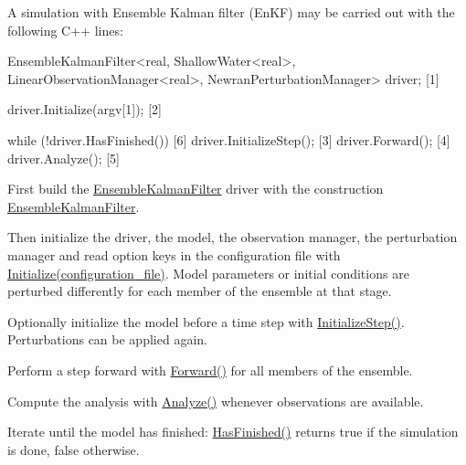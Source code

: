 \documentclass{tufte-book}
\begin{document}
\-A simulation with \-Ensemble \-Kalman filter (\-En\-K\-F) may be carried out with the following \-C++ lines\-:

 \begin{frame_cpp}
EnsembleKalmanFilter<real, ShallowWater<real>,
        LinearObservationManager<real>, NewranPerturbationManager> driver; [1]

driver.Initialize(argv[1]); [2]

while (!driver.HasFinished()) [6]
{
    driver.InitializeStep(); [3]
    driver.Forward(); [4]
    driver.Analyze(); [5]
}
\end{frame_cpp}





\begin{DoxyEnumerate}
\item \-First build the {\ttfamily  \hyperlink{class_verdandi_1_1_ensemble_kalman_filter}{\-Ensemble\-Kalman\-Filter}} driver with the construction {\ttfamily  \hyperlink{class_verdandi_1_1_ensemble_kalman_filter_abb2d27f6bef00753e9998b84fa434903}{\-Ensemble\-Kalman\-Filter}}.


\item \-Then initialize the driver, the model, the observation manager, the perturbation manager and read option keys in the configuration file with {\ttfamily  \hyperlink{}{\-Initialize(configuration\-\_\-file)}}. \-Model parameters or initial conditions are perturbed differently for each member of the ensemble at that stage.


\item \-Optionally initialize the model before a time step with {\ttfamily  \hyperlink{class_verdandi_1_1_ensemble_kalman_filter_ad83360d77648baa50cb701361a8c9261}{\-Initialize\-Step()}}. \-Perturbations can be applied again.


\item \-Perform a step forward with {\ttfamily  \hyperlink{class_verdandi_1_1_ensemble_kalman_filter_aff9ba74ef1ca5d33409a0d1358449093}{\-Forward()}} for all members of the ensemble.


\item \-Compute the analysis with {\ttfamily  \hyperlink{class_verdandi_1_1_ensemble_kalman_filter_ab5ac8954477fd12eb49acf81793d76b6}{\-Analyze()}} whenever observations are available.


\item \-Iterate until the model has finished\-: {\ttfamily  \hyperlink{class_verdandi_1_1_ensemble_kalman_filter_a9eda1d9299a0677c40c39491fea855a8}{\-Has\-Finished()}} returns true if the simulation is done, false otherwise.
\end{DoxyEnumerate}
\end{document}
